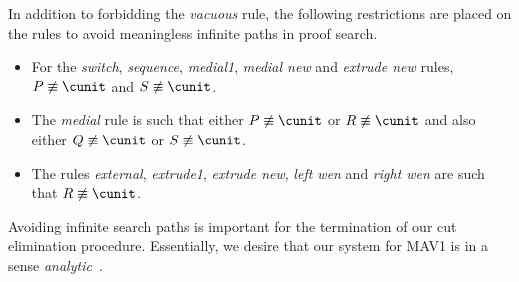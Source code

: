 \documentclass[UKenglish,acmsmall,authorversion]{acmart}
\theoremstyle{plain}
\begin{document}
In addition to forbidding the \textit{vacuous} rule, 
the following restrictions are placed on the rules to avoid meaningless infinite paths in proof search.
\begin{itemize}
\item For the \textit{switch}, \textit{sequence}, \textit{medial1}, \textit{medial new} and \textit{extrude new} rules, $P \not \equiv \cunit$ and $S \not \equiv \cunit$.
\item The \textit{medial} rule is such that either $P \not\equiv \cunit$ or $R \not\equiv \cunit$
and also either $Q \not\equiv \cunit$ or $S \not\equiv \cunit$.
\item The rules \textit{external}, \textit{extrude1}, \textit{extrude new}, \textit{left wen} and \textit{right wen} are such that $R \not \equiv \cunit$.
\end{itemize}
Avoiding infinite search paths is important for the termination of our cut elimination procedure.
Essentially, we desire that our system for \textsf{MAV1} is in a sense \textit{analytic}~\cite{Bruscoli2009}.
\end{document}
